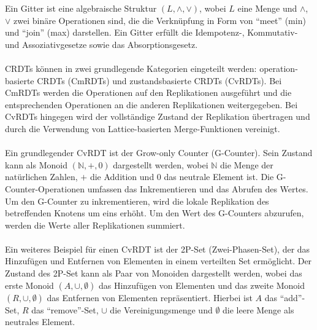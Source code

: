 \documentclass[../vs-script-first-v01.tex]{subfiles}
\begin{document}
Ein Gitter ist eine algebraische Struktur $(L, \wedge, \vee)$, wobei $L$ eine Menge und $\wedge$, $\vee$ zwei binäre Operationen sind, die die Verknüpfung in Form von \enquote{meet} (min) und \enquote{join} (max) darstellen. Ein Gitter erfüllt die Idempotenz-, Kommutativ- und Assoziativgesetze sowie das Absorptionsgesetz.
\\\\
CRDTs können in zwei grundlegende Kategorien eingeteilt werden: operation-basierte CRDTs (CmRDTs) und zustandsbasierte CRDTs (CvRDTs). Bei CmRDTs werden die Operationen auf den Replikationen ausgeführt und die entsprechenden Operationen an die anderen Replikationen weitergegeben. Bei CvRDTs hingegen wird der vollständige Zustand der Replikation übertragen und durch die Verwendung von Lattice-basierten Merge-Funktionen vereinigt.
\\\\
Ein grundlegender CvRDT ist der Grow-only Counter (G-Counter). Sein Zustand kann als Monoid $(\mathbb{N}, +, 0)$ dargestellt werden, wobei $\mathbb{N}$ die Menge der natürlichen Zahlen, $+$ die Addition und $0$ das neutrale Element ist. Die G-Counter-Operationen umfassen das Inkrementieren und das Abrufen
des Wertes. Um den G-Counter zu inkrementieren, wird die lokale Replikation des betreffenden Knotens um eins erhöht. Um den Wert des G-Counters abzurufen, werden die Werte aller Replikationen summiert.
\\\\
Ein weiteres Beispiel für einen CvRDT ist der 2P-Set (Zwei-Phasen-Set), der das Hinzufügen und Entfernen von Elementen in einem verteilten Set ermöglicht. Der Zustand des 2P-Set kann als Paar von Monoiden dargestellt werden, wobei das erste Monoid $(A, \cup, \emptyset)$ das Hinzufügen von Elementen und das zweite Monoid $(R, \cup, \emptyset)$ das Entfernen von Elementen repräsentiert. Hierbei ist $A$ das \enquote{add}-Set, $R$ das \enquote{remove}-Set, $\cup$ die Vereinigungsmenge und $\emptyset$ die leere Menge als neutrales Element.
\end{document}
